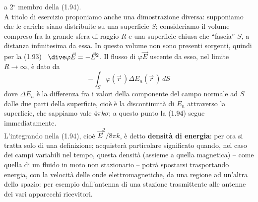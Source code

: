 a 2$^\circ$ membro della (1.94).\\
A titolo di esercizio proponiamo anche una dimostrazione diversa: supponiamo che
le cariche siano distribuite su una superficie $S$; consideriamo il volume
compreso fra la grande sfera di raggio $R$ e una superficie chiusa che
``fascia'' $S$, a distanza infinitesima da essa. In questo volume non sono
presenti sorgenti, quindi per la (1.93) \ $\dive\varphi\vec E=-\vec E^2$. Il
flusso di $\varphi\vec E$ uscente da esso, nel limite $R\to\infty$, \`e dato da
\[
  -\int_S\varphi(\vec r\,)\Delta E_n(\vec r\,)\,dS
\]
dove $\Delta E_n$ \`e la differenza fra i valori della componente del campo
normale ad $S$ dalle due parti della superficie, cio\`e \`e la discontinuit\`a
di $E_n$ attraverso la superficie, che sappiamo vale $4\pi k\sigma$; a questo
punto la (1.94) segue immediatamente.\\
L'integrando nella (1.94), cio\`e $\vec E^2/8\pi k$, \`e detto \textbf{densit\`a
di energia}: per ora si tratta solo di una definizione; acquister\`a particolare
significato quando, nel caso dei campi variabili nel tempo, questa densit\`a
(assieme a quella magnetica) -- come quella di un fluido in moto non stazionario
-- potr\`a spostarsi trasportando energia, con la velocit\`a delle onde
elettromagnetiche, da una regione ad un'altra dello spazio: per esempio
dall'antenna di una stazione trasmittente alle antenne dei vari apparecchi
ricevitori.

